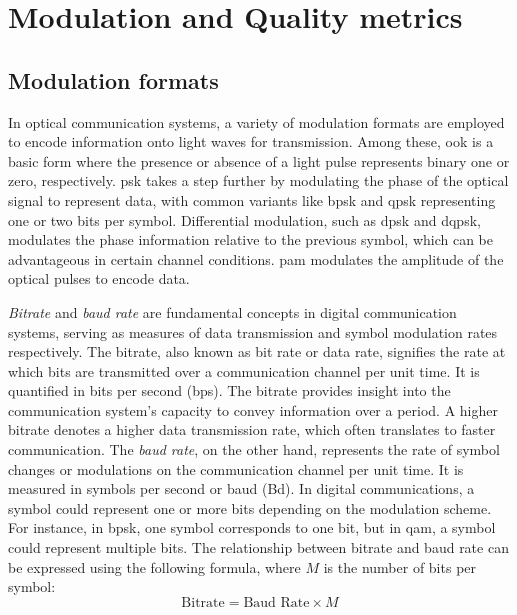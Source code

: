 \section{Modulation and Quality metrics}

\subsection{Modulation formats}

In optical communication systems, a variety of modulation formats are employed to encode information onto light waves for transmission. Among these, \acrfull{ook} is a basic form where the presence or absence of a light pulse represents binary one or zero, respectively. \acrfull{psk} takes a step further by modulating the phase of the optical signal to represent data, with common variants like \acrfull{bpsk} and \acrfull{qpsk} representing one or two bits per symbol. Differential modulation, such as \acrfull{dpsk} and \acrfull{dqpsk}, modulates the phase information relative to the previous symbol, which can be advantageous in certain channel conditions. \acrfull{pam} modulates the amplitude of the optical pulses to encode data.

\textit{Bitrate} and \textit{baud rate} are fundamental concepts in digital communication systems, serving as measures of data transmission and symbol modulation rates respectively. The bitrate, also known as bit rate or data rate, signifies the rate at which bits are transmitted over a communication channel per unit time. It is quantified in bits per second (bps). The bitrate provides insight into the communication system's capacity to convey information over a period. A higher bitrate denotes a higher data transmission rate, which often translates to faster communication. The \textit{baud rate}, on the other hand, represents the rate of symbol changes or modulations on the communication channel per unit time. It is measured in symbols per second or baud (Bd). In digital communications, a symbol could represent one or more bits depending on the modulation scheme. For instance, in \acrshort{bpsk}, one symbol corresponds to one bit, but in \acrfull{qam}, a symbol could represent multiple bits. The relationship between bitrate and baud rate can be expressed using the following formula, where $M$ is the number of bits per symbol:
\begin{equation}
\text{Bitrate} = \text{Baud Rate} \times M
\end{equation}

